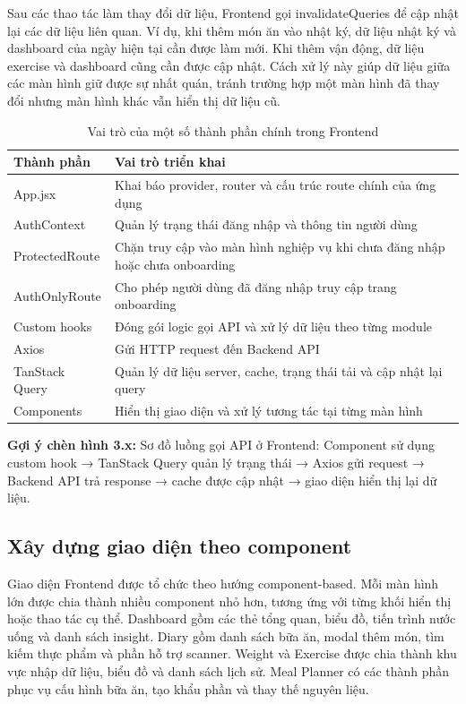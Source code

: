 \documentclass[12pt, a4paper]{report}
\begin{document}
Sau các thao tác làm thay đổi dữ liệu, Frontend gọi invalidateQueries để cập nhật lại các dữ liệu liên quan. Ví dụ, khi thêm món ăn vào nhật ký, dữ liệu nhật ký và dashboard của ngày hiện tại cần được làm mới. Khi thêm vận động, dữ liệu exercise và dashboard cũng cần được cập nhật. Cách xử lý này giúp dữ liệu giữa các màn hình giữ được sự nhất quán, tránh trường hợp một màn hình đã thay đổi nhưng màn hình khác vẫn hiển thị dữ liệu cũ.

\begin{table}[htbp]
\centering
\caption{Vai trò của một số thành phần chính trong Frontend}
\begin{tabular}{|p{5cm}|p{10cm}|}
\hline
\textbf{Thành phần} & \textbf{Vai trò triển khai} \\
\hline
App.jsx & Khai báo provider, router và cấu trúc route chính của ứng dụng \\
\hline
AuthContext & Quản lý trạng thái đăng nhập và thông tin người dùng \\
\hline
ProtectedRoute & Chặn truy cập vào màn hình nghiệp vụ khi chưa đăng nhập hoặc chưa onboarding \\
\hline
AuthOnlyRoute & Cho phép người dùng đã đăng nhập truy cập trang onboarding \\
\hline
Custom hooks & Đóng gói logic gọi API và xử lý dữ liệu theo từng module \\
\hline
Axios & Gửi HTTP request đến Backend API \\
\hline
TanStack Query & Quản lý dữ liệu server, cache, trạng thái tải và cập nhật lại query \\
\hline
Components & Hiển thị giao diện và xử lý tương tác tại từng màn hình \\
\hline
\end{tabular}
\end{table}
\textbf{Gợi ý chèn hình 3.x:} Sơ đồ luồng gọi API ở Frontend: Component sử dụng custom hook → TanStack Query quản lý trạng thái → Axios gửi request → Backend API trả response → cache được cập nhật → giao diện hiển thị lại dữ liệu.

\subsection{Xây dựng giao diện theo component}Giao diện Frontend được tổ chức theo hướng component-based. Mỗi màn hình lớn được chia thành nhiều component nhỏ hơn, tương ứng với từng khối hiển thị hoặc thao tác cụ thể. Dashboard gồm các thẻ tổng quan, biểu đồ, tiến trình nước uống và danh sách insight. Diary gồm danh sách bữa ăn, modal thêm món, tìm kiếm thực phẩm và phần hỗ trợ scanner. Weight và Exercise được chia thành khu vực nhập dữ liệu, biểu đồ và danh sách lịch sử. Meal Planner có các thành phần phục vụ cấu hình bữa ăn, tạo khẩu phần và thay thế nguyên liệu.
\end{document}

